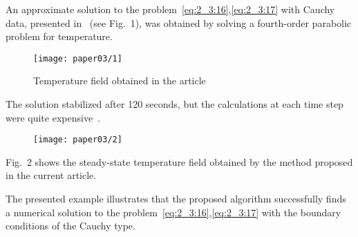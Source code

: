 An approximate solution to the
problem~\eqref{eq:2_3:16},\eqref{eq:2_3:17} with Cauchy data,
presented in~\cite{Chebotarev2019Problem} (see Fig.\ 1),
was obtained by solving a fourth-order parabolic problem for temperature.

\begin{figure}[h]
    \label{fig:2_3:1}
    \texttt{[image: paper03/1]}
    \caption{Temperature field obtained in the article~\cite{Chebotarev2019Problem}}
\end{figure}

The solution stabilized after 120 seconds, but
the calculations at each time step were
quite expensive~\cite{Chebotarev2019Problem}.


\begin{figure}[h]
    \label{fig:2_3:2}
    \texttt{[image: paper03/2]}
    \caption{}
\end{figure}
Fig.\ 2 shows the steady-state temperature field obtained by
the method proposed in the current article.

The presented example illustrates that the proposed
algorithm successfully finds a numerical solution to the
problem~\eqref{eq:2_3:16},\eqref{eq:2_3:17} with the boundary
conditions of the Cauchy type.
